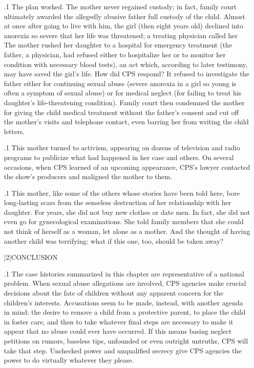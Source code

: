 \documentclass[11pt, twoside]{article}
\begin{document}
{\p.1{%
The plan worked. The mother never regained custody; in fact, family court ultimately awarded the allegedly abusive father full custody
of the child. Almost at once after going to live with him, the girl (then
eight years old) declined into anorexia so severe that her life was threatened; a treating physician called her  The mother rushed her daughter to a hospital for
emergency treatment (the father, a physician, had refused either to hospitalize her or to monitor her condition with necessary blood tests),
an act which, according to later testimony, may have saved the girl's
life. How did CPS respond? It refused to investigate the father either
for continuing sexual abuse (severe anorexia in a girl so young is often a symptom of sexual abuse) or for medical neglect (for failing to
treat his daughter's life-threatening condition). Family court then condemned the mother for giving the child medical treatment without the
father's consent and cut off the mother's visits and telephone contact,
even barring her from writing the child letters.
}%

\p.1{%
This mother turned to activism, appearing on dozens of television and
radio programs to publicize what had happened in her case and others.
On several occasions, when CPS learned of an upcoming appearance,
CPS's lawyer contacted the show's producers and maligned the mother
to them.
}%

\p.1{%
This mother, like some of the others whose stories have been told here,
bore long-lasting scars from the senseless destruction of her relationship
with her daughter. For years, she did not buy new clothes or date men. In
fact, she did not even go for gynecological examinations. She told family
members that she could not think of herself as a woman, let alone as a
mother. And the thought of having another child was terrifying: what if
this one, too, should be taken away?
}%


\s|2|{CONCLUSION}

\p.1{%
\noindent{}The case histories summarized in this chapter are representative of a
national problem. When sexual abuse allegations are involved, CPS
agencies make crucial decisions about the fate of children without any
apparent concern for the children's interests. Accusations seem to be
made, instead, with another agenda in mind: the desire to remove a
child from a protective parent, to place the child in foster care, and
then to take whatever final steps are necessary to make it appear that
no abuse could ever have occurred. If this means basing neglect petitions on rumors, baseless tips, unfounded  or even outright
untruths, CPS will take that step. Unchecked power and unqualified
secrecy give CPS agencies the power to do virtually whatever they
please.
}%

}
\end{document}
